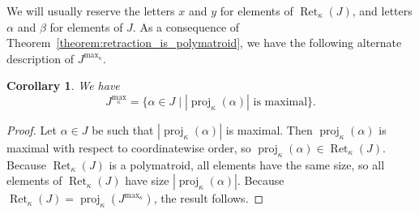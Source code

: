 \documentclass[10pt,a4paper]{amsart}
\newtheorem{corollary}[theorem]{Corollary}
\DeclareMathOperator{\proj}{proj}              %
\newcommand{\kproj}{\proj_{\kappa}}            %
\DeclareMathOperator{\Ret}{Ret}                %
\newcommand{\RetK}{\Ret_{\kappa}}              %
\newcommand{\Jmax}{J^{\max_{\kappa}}}
\begin{document}
We will usually reserve the letters $x$ and $y$ for elements of $\RetK(J)$, and letters $\alpha$ and $\beta$ for elements of $J$. As a consequence of Theorem~\ref{theorem:retraction_is_polymatroid}, we have the following alternate description of $\Jmax$.
\begin{corollary} \label{corollary:Jmax_size_description}
    We have
    \[
        \Jmax = \{\alpha\in J \mid |\kproj(\alpha)| \text{ is maximal}\}.
    \]
\end{corollary}
\begin{proof}
    Let $\alpha \in J$ be such that $|\kproj(\alpha)|$ is maximal. Then $\kproj(\alpha)$ is maximal with respect to coordinatewise order, so $\kproj(\alpha) \in \RetK(J)$. Because $\RetK(J)$ is a polymatroid, all elements have the same size, so all elements of $\RetK(J)$ have size $|\kproj(\alpha)|$. Because $\RetK(J) = \kproj(\Jmax)$, the result follows.
\end{proof}
\end{document}
